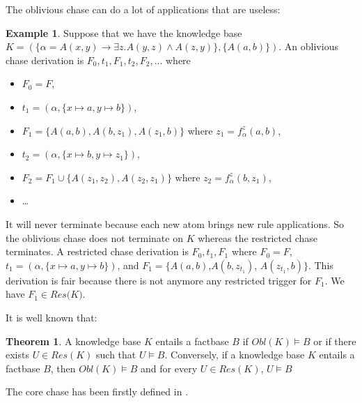 \documentclass{article}
\theoremstyle{definition}
\newtheorem{theorem}{Theorem}[section]
\newtheorem{example}{Example}[section]
\theoremstyle{remark}
\begin{document}
The oblivious chase  can do a lot of applications that are useless: 
\begin{example}
Suppose that we have the knowledge base $K=(\{\alpha  = A(x,y) \rightarrow \exists z.A(y,z) \wedge A(z,y)\},\{A(a,b)\})$. An oblivious chase derivation is $F_0,t_1,F_1,t_2,F_2,...$ where
\begin{itemize}
\item $F_0 = F$, 
\item $t_1=(\alpha,\{x \mapsto a, y \mapsto b\})$, 
\item $F_1=\{A(a,b),A(b,z_1),A(z_1,b)\}$ where $z_1 =f_\alpha^z(a,b)$,
\item $t_2=(\alpha,\{x \mapsto b, y \mapsto z_1\})$, 
\item $F_2=F_1 \cup \{ A(z_1,z_2), A(z_2,z_1)\}$ where $z_2= f_\alpha^z(b,z_1)$, 
\item \ldots\ 
\end{itemize} 
It will never terminate because each new atom brings new rule applications. So the oblivious chase does not terminate on $K$ whereas the restricted chase terminates. A restricted chase derivation is $F_0,t_1,F_1$ where $F_0 = F$, $t_1=(\alpha,\{x \mapsto a, y \mapsto b\})$, and $F_1=\{A(a,b)$,$A(b,z_{t_1})$, $A(z_{t_1},b)\}$. This derivation is fair because there is not anymore any restricted trigger for $F_1$. We have $F_1 \in \textit{Res(K)}$.
\end{example}


It is well known that:

\begin{theorem}
A knowledge base $K$ entails a factbase $B$ if $\textit{Obl}(K) \models B$ or if there exists $U \in \textit{Res}(K)$ such that $U \models B$. Conversely, if a knowledge base $K$ entails a factbase $B$, then $\textit{Obl}(K) \models B$ and for every $U \in \textit{Res}(K)$, $U \models B$
\end{theorem}


The core chase has been firstly defined in \cite{core_chase}.
\end{document}
